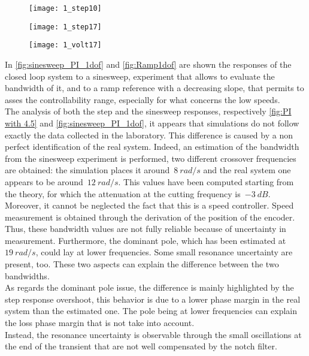 \newpage

\begin{figure*}[h]
	\centering
	\begin{subfigure}{0.4\columnwidth}
		\texttt{[image: 1\_step10]}
	\end{subfigure}
	\begin{subfigure}{0.4\columnwidth}
		\texttt{[image: 1\_step17]}
	\end{subfigure}
	\begin{subfigure}{0.4\columnwidth}
		\texttt{[image: 1\_volt17]}
	\end{subfigure}
	\caption{Speed control loop with $k_{v}=4.5$}
	\label{fig:PI with 4.5}
\end{figure*}

In \cref{fig:sinesweep_PI_1dof} and \cref{fig:Ramp1dof} are shown the responses of the closed loop system to a sinesweep, experiment that allows to evaluate the bandwidth of it, and to a ramp reference with a decreasing slope, that permits to asses the controllability range, especially for what concerns the low speeds. \\
The analysis of both the step and the sinesweep responses, respectively \cref{fig:PI with 4.5} and \cref{fig:sinesweep_PI_1dof}, it appears that simulations do not follow exactly the data collected in the laboratory. This difference is caused by a non perfect identification of the real system. Indeed, an estimation of the bandwidth from the sinesweep experiment is performed, two different crossover frequencies are obtained: the simulation places it around~$8\ rad/s$ and the real system one appears to be around~$12\ rad/s$. This values have been computed starting from the theory, for which the attenuation at the cutting frequency is~$-3\ dB$. \\

Moreover, it cannot be neglected the fact that this is a speed controller. Speed measurement is obtained through the derivation of the position of the encoder. Thus, these bandwidth values are not fully reliable because of uncertainty in measurement. 
Furthermore, the dominant pole, which has been estimated at~$19\ rad/s$, could lay at lower frequencies. Some small resonance uncertainty are present, too. These two aspects can explain the difference between the two bandwidths. \\
As regards the dominant pole issue, the difference is mainly highlighted by the step response overshoot, this behavior is due to a lower phase margin in the real system than the estimated one. The pole being at lower frequencies can explain the loss phase margin that is not take into account. \\
Instead, the resonance uncertainty is observable through the small oscillations at the end of the transient that are not well compensated by the notch filter. \\

